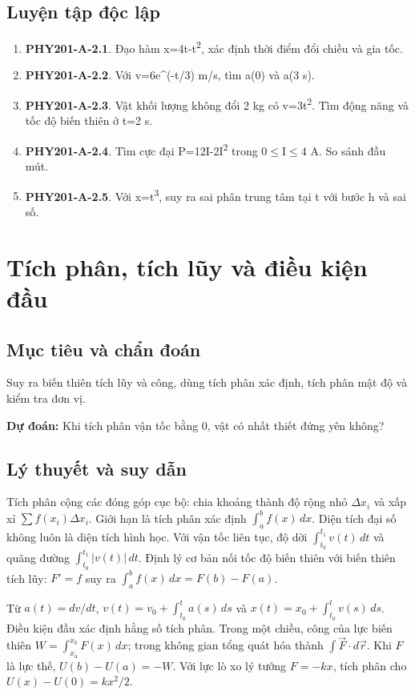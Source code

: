 \documentclass[11pt,a4paper,openany]{book}
\begin{document}
\section{Luyện tập độc lập}
\begin{enumerate}
\item \textbf{PHY201-A-2.1}. Đạo hàm x=4t-t\textsuperscript{2}, xác định thời điểm đổi chiều và gia tốc.
\item \textbf{PHY201-A-2.2}. Với v=6e^(-t/3) m/s, tìm a(0) và a(3 s).
\item \textbf{PHY201-A-2.3}. Vật khối lượng không đổi 2 kg có v=3t\textsuperscript{2}. Tìm động năng và tốc độ biến thiên ở t=2 s.
\item \textbf{PHY201-A-2.4}. Tìm cực đại P=12I-2I\textsuperscript{2} trong 0\ensuremath{\le}I\ensuremath{\le}4 A. So sánh đầu mút.
\item \textbf{PHY201-A-2.5}. Với x=t\textsuperscript{3}, suy ra sai phân trung tâm tại t với bước h và sai số.
\end{enumerate}
\chapter{Tích phân, tích lũy và điều kiện đầu}
\section{Mục tiêu và chẩn đoán}
Suy ra biến thiên tích lũy và công, dùng tích phân xác định, tích phân mật độ và kiểm tra đơn vị.

\textbf{Dự đoán:} Khi tích phân vận tốc bằng 0, vật có nhất thiết đứng yên không?
\section{Lý thuyết và suy dẫn}
Tích phân cộng các đóng góp cục bộ: chia khoảng thành độ rộng nhỏ $\Delta x_i$ và xấp xỉ $\sum f(x_i)\Delta x_i$. Giới hạn là tích phân xác định $\int_a^b f(x)\,dx$. Diện tích đại số không luôn là diện tích hình học. Với vận tốc liên tục, độ dời $\int_{t_0}^{t_1}v(t)\,dt$ và quãng đường $\int_{t_0}^{t_1}|v(t)|\,dt$. Định lý cơ bản nối tốc độ biến thiên với biến thiên tích lũy: $F'=f$ suy ra $\int_a^b f(x)\,dx=F(b)-F(a)$.

Từ $a(t)=dv/dt$, $v(t)=v_0+\int_{t_0}^t a(s)\,ds$ và $x(t)=x_0+\int_{t_0}^t v(s)\,ds$. Điều kiện đầu xác định hằng số tích phân. Trong một chiều, công của lực biến thiên $W=\int_{x_a}^{x_b}F(x)\,dx$; trong không gian tổng quát hóa thành $\int\vec F\cdot d\vec r$. Khi $F$ là lực thế, $U(b)-U(a)=-W$. Với lực lò xo lý tưởng $F=-kx$, tích phân cho $U(x)-U(0)=kx^2/2$.
\end{document}
